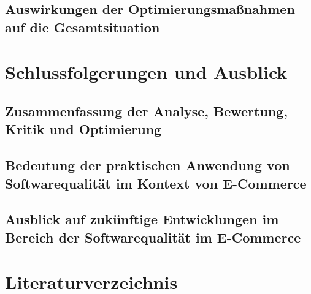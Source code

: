 \documentclass{article}
\begin{document}
\subsection{Auswirkungen der Optimierungsmaßnahmen auf die Gesamtsituation}

\section{Schlussfolgerungen und Ausblick}
\subsection{Zusammenfassung der Analyse, Bewertung, Kritik und Optimierung}
\subsection{Bedeutung der praktischen Anwendung von Softwarequalität im Kontext von E-Commerce}
\subsection{Ausblick auf zukünftige Entwicklungen im Bereich der Softwarequalität im E-Commerce}

\section{Literaturverzeichnis}
\printbibliography[title={quellen.tex}]
\end{document}
